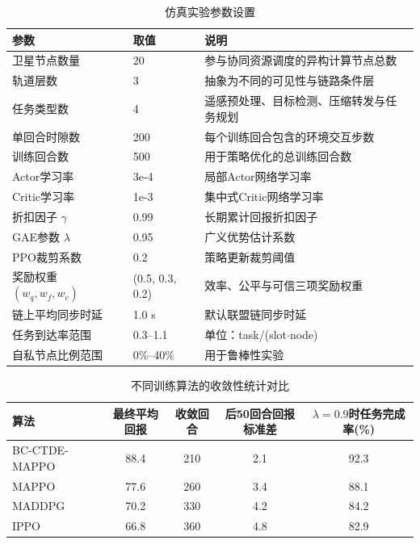 
\begin{table}[htbp]
\centering
\caption{仿真实验参数设置}
\label{tab:ch3_params}
\renewcommand{\arraystretch}{1.15}
\begin{tabularx}{\textwidth}{p{3.4cm}p{2.8cm}X}
\toprule
参数 & 取值 & 说明 \\ 
\midrule
卫星节点数量 & 20 & 参与协同资源调度的异构计算节点总数 \\ 
轨道层数 & 3 & 抽象为不同的可见性与链路条件层 \\ 
任务类型数 & 4 & 遥感预处理、目标检测、压缩转发与任务规划 \\ 
单回合时隙数 & 200 & 每个训练回合包含的环境交互步数 \\ 
训练回合数 & 500 & 用于策略优化的总训练回合数 \\ 
Actor学习率 & 3e-4 & 局部Actor网络学习率 \\ 
Critic学习率 & 1e-3 & 集中式Critic网络学习率 \\ 
折扣因子 $\gamma$ & 0.99 & 长期累计回报折扣因子 \\ 
GAE参数 $\lambda$ & 0.95 & 广义优势估计系数 \\ 
PPO裁剪系数 & 0.2 & 策略更新裁剪阈值 \\ 
奖励权重 $(w_q,w_f,w_c)$ & (0.5, 0.3, 0.2) & 效率、公平与可信三项奖励权重 \\ 
链上平均同步时延 & 1.0 s & 默认联盟链同步时延 \\ 
任务到达率范围 & 0.3--1.1 & 单位：task/(slot$\cdot$node) \\ 
自私节点比例范围 & 0\%--40\% & 用于鲁棒性实验 \\ 
\bottomrule
\end{tabularx}
\end{table}

\begin{table}[htbp]
\centering
\caption{不同训练算法的收敛性统计对比}
\label{tab:ch3_convergence}
\begin{tabular}{lcccc}
\toprule
算法 & 最终平均回报 & 收敛回合 & 后50回合回报标准差 & $\lambda=0.9$时任务完成率(\%) \\ 
\midrule
BC-CTDE-MAPPO & 88.4 & 210 & 2.1 & 92.3 \\ 
MAPPO & 77.6 & 260 & 3.4 & 88.1 \\ 
MADDPG & 70.2 & 330 & 4.2 & 84.2 \\ 
IPPO & 66.8 & 360 & 4.8 & 82.9 \\ 
\bottomrule
\end{tabular}
\end{table}

